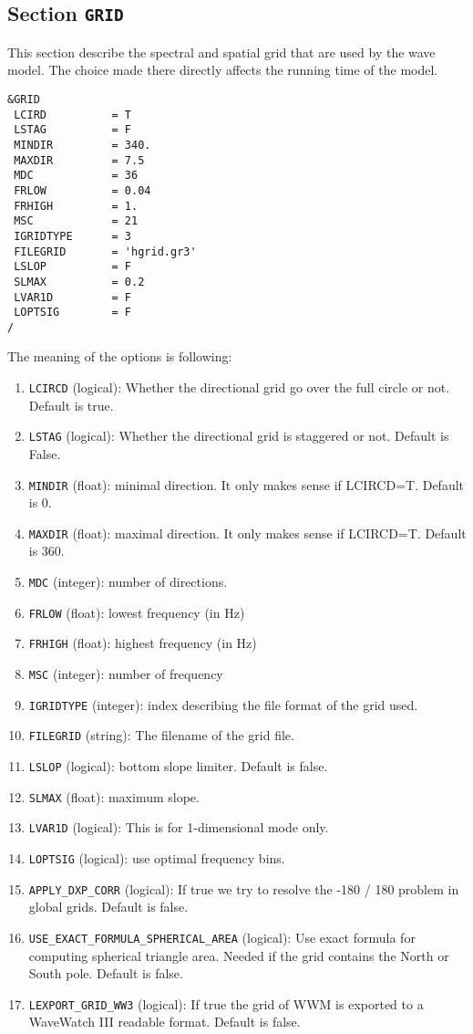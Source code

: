 \documentclass[12pt]{amsart}
\begin{document}
\subsection{Section {\tt GRID}}
This section describe the spectral and spatial grid that are used by the wave model.
The choice made there directly affects the running time of the model.

\begin{verbatim}
&GRID
 LCIRD          = T                 
 LSTAG          = F                 
 MINDIR         = 340.              
 MAXDIR         = 7.5               
 MDC            = 36                
 FRLOW          = 0.04              
 FRHIGH         = 1.                
 MSC            = 21                
 IGRIDTYPE      = 3                 
 FILEGRID       = 'hgrid.gr3'
 LSLOP          = F          
 SLMAX          = 0.2        
 LVAR1D         = F          
 LOPTSIG        = F          
/
\end{verbatim}
The meaning of the options is following:
\begin{enumerate}
\item {\tt LCIRCD} (logical): Whether the directional grid go over the full circle or not. Default is true.
\item {\tt LSTAG} (logical): Whether the directional grid is staggered or not. Default is False.
\item {\tt MINDIR} (float): minimal direction. It only makes sense if LCIRCD=T. Default is 0.
\item {\tt MAXDIR} (float): maximal direction. It only makes sense if LCIRCD=T. Default is 360.
\item {\tt MDC} (integer): number of directions.
\item {\tt FRLOW} (float): lowest frequency (in Hz)
\item {\tt FRHIGH} (float): highest frequency (in Hz)
\item {\tt MSC} (integer): number of frequency
\item {\tt IGRIDTYPE} (integer): index describing the file format of the grid used.
\item {\tt FILEGRID} (string): The filename of the grid file.
\item {\tt LSLOP} (logical): bottom slope limiter. Default is false.
\item {\tt SLMAX} (float): maximum slope.
\item {\tt LVAR1D} (logical): This is for 1-dimensional mode only.
\item {\tt LOPTSIG} (logical): use optimal frequency bins.
\item {\tt APPLY\_DXP\_CORR} (logical): If true we try to resolve the -180 / 180 problem in global grids. Default is false.
\item {\tt USE\_EXACT\_FORMULA\_SPHERICAL\_AREA} (logical): Use exact formula for computing spherical triangle area. Needed if the grid contains the North or South pole. Default is false.
\item {\tt LEXPORT\_GRID\_WW3} (logical): If true the grid of WWM is exported to a WaveWatch III readable format. Default is false.
\end{enumerate}
\end{document}
